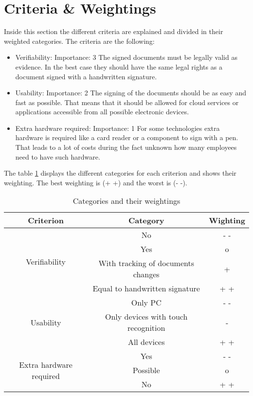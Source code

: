 \section{Criteria \& Weightings} \label{sec:criteria}
Inside this section the different criteria are explained and divided in their weighted categories. The criteria are the following:
\begin{itemize}
	\item Verifiability: \newline
	Importance: 3 \newline
	The signed documents must be legally valid as evidence. In the best case they should have the same legal rights as a document signed with a handwritten signature.
	\item Usability: \newline
	Importance: 2 \newline
	The signing of the documents should be as easy and fast as possible. That means that it should be allowed for cloud services or applications accessible from all possible electronic devices. 
	\item Extra hardware required: \newline
	Importance: 1 \newline
	For some technologies extra hardware is required like a card reader or a component to sign with a pen. That leads to a lot of costs during the fact unknown how many employees need to have such hardware.
\end{itemize} 

The table \ref{Tab:criteria} displays the different categories for each criterion and shows their weighting. The best weighting is (+ +) and the worst is (- -). 

\begin{table}[h]
	\begin{tabular}{|c|c|c|} \hline
		Criterion  & Category & Wighting \\ \hline
		\multirow{4}{*}{Verifiability} & No & - - \\ \cline{2-3}
									   & Yes & o \\ \cline{2-3}
									   & With tracking of documents changes & + \\ \cline{2-3}
									   & Equal to handwritten signature & + + \\ \cline{1-3}
		\multirow{3}{*}{Usability} & Only PC & - - \\ \cline{2-3}
		                           & Only devices with touch recognition & - \\ \cline{2-3}
								   & All devices & + + \\ \cline{1-3}
		\multirow{3}{*}{Extra hardware required} & Yes & - -\\ \cline{2-3}
												& Possible & o \\ \cline{2-3}
												& No & + +  \\ \cline{1-3}
	\end{tabular}
	\caption{Categories and their weightings}
	\label{Tab:criteria}
\end{table}